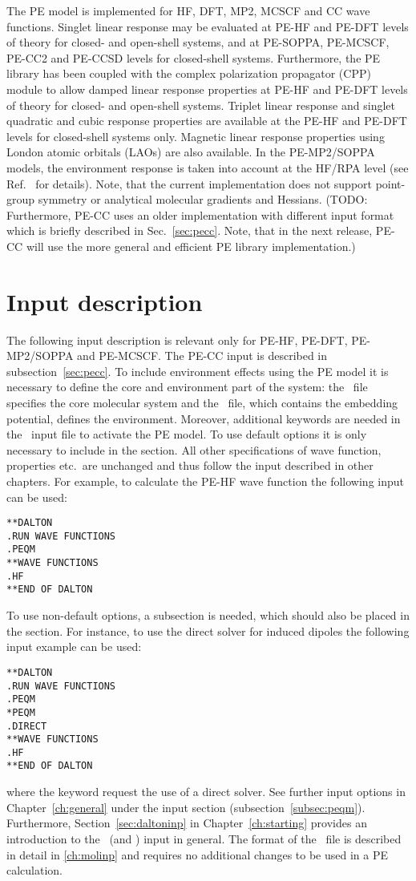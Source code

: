 The PE model is implemented for HF, DFT, MP2, MCSCF and
CC wave functions. Singlet linear response may be evaluated
at PE-HF and PE-DFT levels of theory for closed- and open-shell systems,
and at PE-SOPPA, PE-MCSCF, PE-CC2 and PE-CCSD levels for closed-shell systems.
Furthermore, the PE library has been coupled with the complex polarization
propagator (CPP) module to allow damped linear response properties at
PE-HF and PE-DFT levels of theory for closed- and open-shell systems. Triplet
linear response and singlet quadratic and cubic response properties are available
at the PE-HF and PE-DFT levels for closed-shell systems only. Magnetic linear
response properties using London atomic orbitals (LAOs) are also available.
In the PE-MP2/SOPPA models, the environment response is
taken into account at the HF/RPA level (see Ref.~\cite{pesoppa} for details).
Note, that the current implementation does not support point-group symmetry
or analytical molecular gradients and Hessians.
(TODO: Furthermore, PE-CC uses
an older implementation with different input format which is briefly described
in Sec.~\ref{sec:pecc}.  Note, that in the next release, PE-CC will use the
more general and efficient PE library implementation.)


\section{Input description}
The following input description is relevant only for PE-HF, PE-DFT,
PE-MP2/SOPPA and PE-MCSCF. The PE-CC input is described in
subsection~\ref{sec:pecc}. To include environment effects using the PE model it
is necessary to define the core and environment part of the system: the \molinp\
file specifies the core molecular system and the \potinp\ file, which contains
the embedding potential, defines the environment. Moreover, additional
keywords are needed in the \dalinp\ input file to activate the PE model. To use
default options it is only necessary to include \Key{PEQM} in the \Sec{*DALTON}
section. All other specifications of wave function, properties etc.\ are
unchanged and thus follow the input described in other chapters. For example, to
calculate the PE-HF wave function the following input can be used:
\begin{verbatim}
**DALTON
.RUN WAVE FUNCTIONS
.PEQM
**WAVE FUNCTIONS
.HF
**END OF DALTON
\end{verbatim}
To use non-default options, a  subsection is needed, which should also be placed in the
\Sec{*DALTON} section. For instance, to use the direct solver for induced
dipoles the following input example can be used:
\begin{verbatim}
**DALTON
.RUN WAVE FUNCTIONS
.PEQM
*PEQM
.DIRECT
**WAVE FUNCTIONS
.HF
**END OF DALTON
\end{verbatim}
where the  keyword request the use of a direct solver. See further
input options in Chapter~\ref{ch:general} under the \Sec{PEQM}
input section (subsection~\ref{subsec:peqm}). Furthermore,
Section~\ref{sec:daltoninp} in Chapter~\ref{ch:starting} provides an
introduction to the \dalton\ (and \molinp) input in general. The format of the
\molinp\ file is described in detail in \ref{ch:molinp} and requires no
additional changes to be used in a PE calculation.

